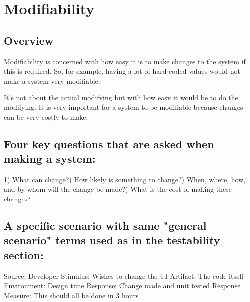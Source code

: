 \documentclass[a4paper]{report}
\begin{document}
\chapter{Modifiability}
\section{Overview}
Modifiability is concerned with how easy it is to make changes to the system if this is required. So, for example, having a lot of hard coded values would not make a system very modifiable.

It's not about the actual modifying but with how easy it would be to do the modifying.
It is very important for a system to be modifiable because changes can be very costly to make.

\section{Four key questions that are asked when making a system:}
1)   What can change?)   How likely is something to change?)   When, where, how, and by whom will the change be made?)   What is the cost of making these changes? \newline

\section{A specific scenario with same "general scenario" terms used as in the testability section:}

Source: Developer \newline
Stimulus: Wishes to change the UI \newline
Artifact: The code itself \newline
Environment: Design time \newline
Response: Change made and unit tested \newline
Response Measure: This should all be done in 3 hours \newline
\end{document}
